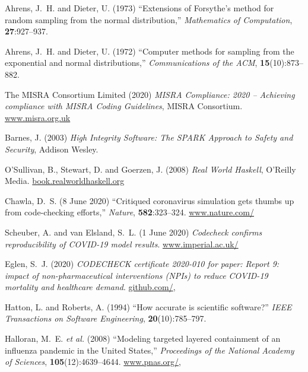 \documentclass{comjnl}
\begin{document}
{\begin{thebibliography}{100}
{{
Ahrens, J.~H. and Dieter, U. (1973) ``Extensions of {Forsythe's} method for
  random sampling from the normal distribution,'' {\em Mathematics of
  Computation}, \textbf{27}:927--937.
\newblock {}

Ahrens, J.~H. and Dieter, U. (1972) ``Computer methods for sampling from the
  exponential and normal distributions,'' {\em Communications of the ACM},
  \textbf{15}(10):873--882.
\newblock {}

{The MISRA Consortium Limited} (2020) {\em {MISRA} Compliance: 2020 --
  Achieving compliance with {MISRA} Coding Guidelines}, MISRA Consortium.
\newblock \url{www.misra.org.uk}

Barnes, J. (2003) {\em High Integrity Software: The {SPARK} Approach to Safety
  and Security}, Addison Wesley.

O'Sullivan, B., Stewart, D. and Goerzen, J. (2008) {\em Real World Haskell},
  O'Reilly Media.
\newblock \url{book.realworldhaskell.org}

Chawla, D.~S. (8 June 2020) ``Critiqued coronavirus simulation gets thumbs up
  from code-checking efforts,'' {\em Nature}, \textbf{582}:323--324.
\newblock
  \url{www.nature.com/}

Scheuber, A. and {van Elsland}, S.~L. (1 June 2020) {\em Codecheck confirms
  reproducibility of {COVID-19} model results}.
\newblock
  \url{www.imperial.ac.uk/}

Eglen, S.~J. (2020) {\em {CODECHECK} certificate 2020-010 for paper: {Report}
  9: impact of non-pharmaceutical interventions ({NPIs}) to reduce {COVID-19}
  mortality and healthcare demand}.
\newblock
  \url{github.com/},

{Hatton}, L. and {Roberts}, A. (1994) ``How accurate is scientific software?''
  {\em IEEE Transactions on Software Engineering}, \textbf{20}(10):785--797.
\newblock {}

Halloran, M.~E. \emph{et al.} (2008) ``Modeling targeted layered containment of
  an influenza pandemic in the {United States},'' {\em Proceedings of the
  National Academy of Sciences}, \textbf{105}(12):4639--4644.
\newblock
  \url{www.pnas.org/},

}}
\end{thebibliography}}
\end{document}
